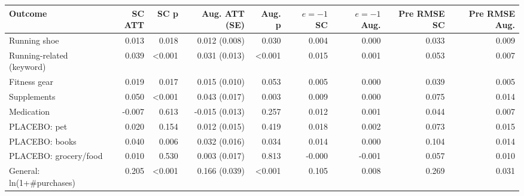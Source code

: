 \begin{tabular}{lrrrrrrrr}
\toprule
Outcome & SC ATT & SC p & Aug. ATT (SE) & Aug. p & $e{=}{-}1$ SC & $e{=}{-}1$ Aug. & Pre RMSE SC & Pre RMSE Aug. \\
\midrule
Running shoe & 0.013 & 0.018 & 0.012 (0.008) & 0.030 & 0.004 & 0.000 & 0.033 & 0.009 \\
Running-related (keyword) & 0.039 & <0.001 & 0.031 (0.013) & <0.001 & 0.015 & 0.001 & 0.053 & 0.007 \\
Fitness gear & 0.019 & 0.017 & 0.015 (0.010) & 0.053 & 0.005 & 0.000 & 0.039 & 0.005 \\
Supplements & 0.050 & <0.001 & 0.043 (0.017) & 0.003 & 0.009 & 0.000 & 0.075 & 0.014 \\
Medication & -0.007 & 0.613 & -0.015 (0.013) & 0.257 & 0.012 & 0.001 & 0.044 & 0.007 \\
PLACEBO: pet & 0.020 & 0.154 & 0.012 (0.015) & 0.419 & 0.018 & 0.002 & 0.073 & 0.015 \\
PLACEBO: books & 0.040 & 0.006 & 0.032 (0.016) & 0.034 & 0.014 & 0.000 & 0.104 & 0.014 \\
PLACEBO: grocery/food & 0.010 & 0.530 & 0.003 (0.017) & 0.813 & -0.000 & -0.001 & 0.057 & 0.010 \\
General: ln(1+\#purchases) & 0.205 & <0.001 & 0.166 (0.039) & <0.001 & 0.105 & 0.008 & 0.269 & 0.031 \\
\bottomrule
\end{tabular}
